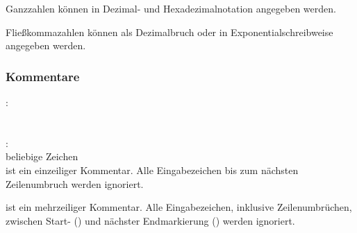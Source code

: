 Ganzzahlen können in Dezimal- und Hexadezimalnotation angegeben werden.

Fließkommazahlen können als Dezimalbruch oder in Exponentialschreibweise
angegeben werden.


\subsubsection{Kommentare}\label{Kommentare}
:\label{COMMENT}\\
\hspace*{1cm}\glq\Gt{//}\grq  \glq{}\grq \\
\hspace*{1cm}\glq\Gt{//}\grq  \glq{}\grq \\
:\label{ML_COMMENT}\\
\hspace*{1cm}\glq\kwMlcStart\grq beliebige Zeichen \glq\kwMlcEnd\grq\\

 ist ein einzeiliger Kommentar. Alle Eingabezeichen bis zum nächsten Zeilenumbruch
werden ignoriert.

 ist ein mehrzeiliger Kommentar. Alle Eingabezeichen, inklusive Zeilenumbrüchen,
zwischen Start- (\kwMlcStart) und nächster Endmarkierung (\kwMlcEnd) werden ignoriert.

